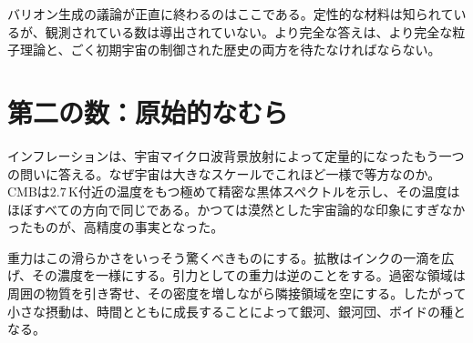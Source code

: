 \begin{classroomqa}
\end{classroomqa}

\begin{classroomqa}
\end{classroomqa}

バリオン生成の議論が正直に終わるのはここである。定性的な材料は知られているが、観測されている数は導出されていない。より完全な答えは、より完全な粒子理論と、ごく初期宇宙の制御された歴史の両方を待たなければならない。

\section{第二の数：原始的なむら}

インフレーションは、宇宙マイクロ波背景放射によって定量的になったもう一つの問いに答える。なぜ宇宙は大きなスケールでこれほど一様で等方なのか。CMBは\(2.7\,\mathrm K\)付近の温度をもつ極めて精密な黒体スペクトルを示し、その温度はほぼすべての方向で同じである。かつては漠然とした宇宙論的な印象にすぎなかったものが、高精度の事実となった。

重力はこの滑らかさをいっそう驚くべきものにする。拡散はインクの一滴を広げ、その濃度を一様にする。引力としての重力は逆のことをする。過密な領域は周囲の物質を引き寄せ、その密度を増しながら隣接領域を空にする。したがって小さな摂動は、時間とともに成長することによって銀河、銀河団、ボイドの種となる。

